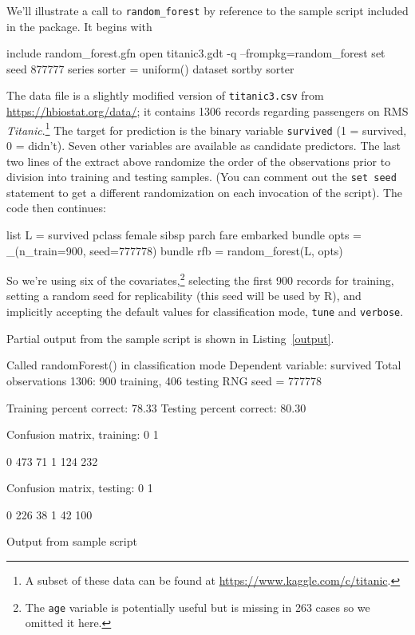 \documentclass{article}
\begin{document}
We'll illustrate a call to \texttt{random\_forest} by reference to the
sample script included in the package.  It begins with
%
\begin{code}
include random_forest.gfn
open titanic3.gdt -q --frompkg=random_forest
set seed 877777
series sorter = uniform()
dataset sortby sorter
\end{code}
%
The data file is a slightly modified version of \texttt{titanic3.csv}
from \url{https://hbiostat.org/data/}; it contains 1306 records
regarding passengers on RMS \textit{Titanic}.\footnote{A subset of
  these data can be found at \url{https://www.kaggle.com/c/titanic}.}
The target for prediction is the binary variable \texttt{survived} (1
= survived, 0 = didn't). Seven other variables are available as
candidate predictors.  The last two lines of the extract above
randomize the order of the observations prior to division into
training and testing samples.  (You can comment out the \texttt{set
  seed} statement to get a different randomization on each invocation
of the script).  The code then continues:
%
\begin{code}
list L = survived pclass female sibsp parch fare embarked
bundle opts = _(n_train=900, seed=777778)
bundle rfb = random_forest(L, opts)
\end{code}
%
So we're using six of the covariates,\footnote{The \texttt{age}
  variable is potentially useful but is missing in 263 cases so we
  omitted it here.}  selecting the first 900 records for training,
setting a random seed for replicability (this seed will be used by
\textsf{R}), and implicitly accepting the default values for
classification mode, \texttt{tune} and \texttt{verbose}.

Partial output from the sample script is shown in
Listing~\ref{output}.

\begin{script}[htbp]
  \begin{scodebit}
Called randomForest() in classification mode
Dependent variable: survived
Total observations 1306: 900 training, 406 testing
RNG seed = 777778

Training percent correct: 78.33
Testing percent correct:  80.30

Confusion matrix, training:
             0            1

0          473           71
1          124          232

Confusion matrix, testing:
             0            1

0          226           38
1           42          100
\end{scodebit}
  \caption{Output from sample script}
  \label{output}
\end{script}
\end{document}
